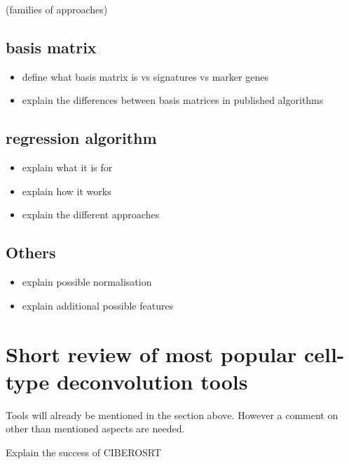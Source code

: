 \documentclass[12pt,]{book}
\providecommand{\tightlist}{%
  \setlength{\itemsep}{0pt}\setlength{\parskip}{0pt}}
\theoremstyle{definition}
\theoremstyle{definition}
\theoremstyle{definition}
\theoremstyle{remark}
\begin{document}
(families of approaches)

\hypertarget{basis-matrix}{%
\subsection{basis matrix}\label{basis-matrix}}

\begin{itemize}
\tightlist
\item
  define what basis matrix is vs signatures vs marker genes
\item
  explain the differences between basis matrices in published algorithms
\end{itemize}

\hypertarget{regression-algorithm}{%
\subsection{regression algorithm}\label{regression-algorithm}}

\begin{itemize}
\tightlist
\item
  explain what it is for
\item
  explain how it works
\item
  explain the different approaches
\end{itemize}

\hypertarget{others}{%
\subsection{Others}\label{others}}

\begin{itemize}
\tightlist
\item
  explain possible normalisation
\item
  explain additional possible features
\end{itemize}

\hypertarget{short-review-of-most-popular-cell-type-deconvolution-tools}{%
\section{Short review of most popular cell-type deconvolution
tools}\label{short-review-of-most-popular-cell-type-deconvolution-tools}}

Tools will already be mentioned in the section above. However a comment
on other than mentioned aspects are needed.

Explain the success of CIBEROSRT
\end{document}
